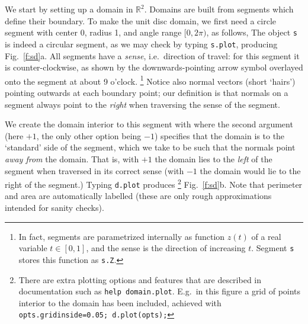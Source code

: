 \documentclass[11pt]{article}
\begin{document}
We start by setting up a domain in $\mathbb{R}^2$.
Domains are built from segments which define their boundary.
To make the unit disc domain,
we first need a circle segment with center
0, radius 1, and angle range
$[0,2\pi)$, as follows,
The object {\tt s} is indeed a circular segment, as we may check by
typing {\tt s.plot}, producing Fig.~\ref{f:sd}a.
All segments have a {\em sense}, i.e.\ direction of travel:
for this segment it is counter-clockwise, as shown by the
downwards-pointing
arrow symbol overlayed onto the segment at about 9 o'clock.%
  \footnote{In fact, segments are parametrized internally as function $z(t)$
    of a real variable $t\in[0,1]$, and the sense is the direction of
    increasing $t$. Segment {\tt s} stores this function as {\tt s.Z}.}
Notice also normal vectors (short `hairs') pointing outwards
at each boundary point; our definition is that
normals on a segment always point to the {\em right} when traversing the
sense of the segment.

We create the domain interior to this segment with
where the second argument (here $+1$, the only other option being $-1$)
specifies that the domain is to the `standard' side of the segment, which
we take to be such that the normals point {\em away from} the domain.
That is, with $+1$ the domain lies to the {\em left} of the segment
when traversed in its correct sense (with $-1$ the domain
would lie to the right of the segment.)
Typing {\tt d.plot} produces%
  \footnote{There are extra plotting options and features that
    are described in documentation such as {\tt help domain.plot}.
    E.g.\ in this figure a grid of points interior to the domain has been
    included, achieved with {\tt opts.gridinside=0.05; d.plot(opts);}
  }
Fig.~\ref{f:sd}b.
Note that perimeter and area are automatically
labelled (these are only rough approximations intended for sanity checks).

\end{document}
